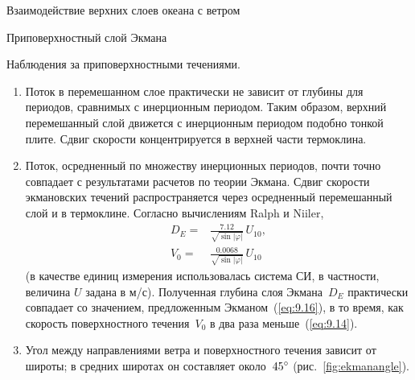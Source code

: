 \begin{chapter}{Взаимодействие верхних слоев океана с ветром}
\begin{section}{Приповерхностный слой Экмана}
\begin{paragraph}{Наблюдения за приповерхностными течениями.}
\begin{enumerate}
\item 
Поток в перемешанном слое практически не зависит от глубины%
 для периодов, сравнимых
с инерционным периодом. 
Таким образом, верхний перемешанный слой движется с инерционным периодом 
подобно тонкой плите. 
Сдвиг скорости концентрируется в верхней части 
термоклина.
%

\item 
Поток, осредненный по множеству инерционных периодов, почти точно совпадает
с результатами расчетов по теории Экмана. Сдвиг скорости экмановских течений
распространяется через осредненный перемешанный 
слой и в термоклине. Согласно 
вычислениям Ralph и Niiler, 
\begin{align}
 D_E =& \frac{7.12}{\sqrt{\sin|\varphi|}}\, U_{10},  \label{eq:9.20}\\
 V_0 =& \frac{0.0068}{\sqrt{\sin|\varphi|}}\, U_{10} \label{eq:9.21}
\end{align}
(в качестве единиц измерения использовалась система СИ, в частности,
величина $U$ задана в м/с). Полученная глубина слоя Экмана~$D_E$ 
практически совпадает со значением, предложенным Экманом~(\ref{eq:9.16}), 
в то время, как скорость поверхностного течения~$V_0$ в два раза 
меньше~(\ref{eq:9.14}).
%

\item 
Угол между направлениями ветра и поверхностного течения зависит от широты;
в средних широтах он составляет около~${45}^\circ$ 
(рис.~\ref{fig:ekmanangle}).
%


\end{enumerate}
\end{paragraph}
\end{section}
\end{chapter}
